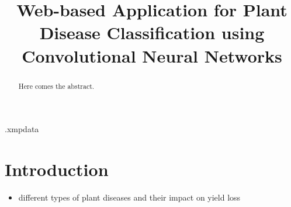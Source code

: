 \documentclass{BachelorBUI}
\title{Web-based Application for Plant Disease Classification using Convolutional Neural Networks}
\begin{document}
\begin{filecontents}[overwrite]{\jobname.xmpdata}
\makeatletter
\Title{\@title}
\Author{\@authorname}
\Language{\@thesislanguage}
\Keywords{\@keywords}
\makeatother
\end{filecontents}
%
\maketitle
\begin{abstract}

Here comes the abstract.

\end{abstract}
\tableofcontents
\section{Introduction}
\begin{itemize}
    \item different types of plant diseases and their impact on yield loss
\end{itemize}
\end{document}
